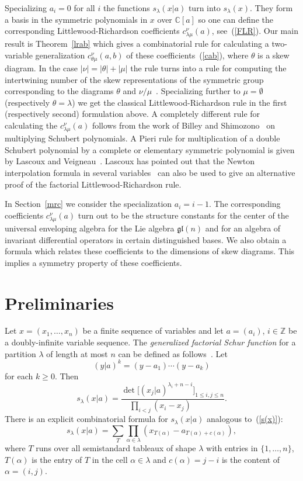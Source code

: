 \documentclass[titlepage,12pt]{article}
\newcommand{\beq}{\begin{equation}}
\newcommand{\eeq}{\end{equation}}
\newcommand{\la}{\lambda}
\newcommand{\0}{{\bf 0}}
\newcommand{\1}{{\bf 1}}
\newcommand{\2}{{\bf 2}}
\newcommand{\3}{{\bf 3}}
\newcommand{\4}{{\bf 4}}
\newcommand{\5}{{\bf 5}}
\newcommand{\6}{{\bf 6}}
\newcommand{\7}{{\bf 7}}
\newcommand{\8}{{\bf 8}}
\newcommand{\9}{{\bf 9}}
\newcommand{\C}{\mathbb{C}}
\newcommand{\gl}{\mathfrak{gl}}
\begin{document}
Specializing $a_i=0$ for all $i$ the functions 
$s_{\lambda}(x|a)$  turn into $s_{\lambda}(x)$. They
form a basis in the symmetric polynomials
in $x$ over $\C[a]$ so one can define the corresponding
Littlewood-Richardson coefficients $c_{\lambda\mu}^{\nu}(a)$,
see~(\ref{FLR}).  Our main result is Theorem~\ref{lrab} which
gives a combinatorial rule for calculating a two-variable
generalization $c_{\theta\mu}^{\nu}(a,b)$ of these
coefficients~(\ref{cab}), where $\theta$ is a skew diagram. 
In the case $|\nu|=|\theta|+|\mu|$ the rule turns into a rule for
computing the intertwining number of the skew
representations of the symmetric group corresponding to the diagrams
$\theta$ and $\nu/\mu$~\cite{jp:sss,zel:glr}.
Specializing further to  $\mu=\emptyset$ (respectively $\theta=\lambda$) we
get
the classical Littlewood-Richardson rule in the first (respectively
second)
formulation above.  
A completely different rule for calculating
the $c_{\la\mu}^\nu(a)$ follows from the work of Billey and
Shimozono~\cite{bs:nas} on multiplying Schubert polynomials.
A Pieri rule for multiplication of a double Schubert polynomial
by a complete or elementary symmetric polynomial is given by
Lascoux and Veigneau~\cite{vei:t}.  Lascoux has pointed out that
the Newton interpolation formula in several variables~\cite{ls:in} can
also be used to give an alternative proof of the factorial
Littlewood-Richardson rule.

In Section~\ref{mrc} we consider the specialization $a_i=i-1$.
The corresponding  coefficients $c_{\lambda\mu}^{\nu}(a)$ turn out to
be the structure constants for the center of the universal
enveloping algebra for the Lie algebra $\gl(n)$
and for an algebra of invariant differential operators in certain
distinguished bases.  We also obtain a formula which relates
these coefficients to the dimensions of skew diagrams. This implies
a symmetry property of these coefficients. 



\section{Preliminaries}		\label{p}

Let $x=(x_1,\dots,x_n)$ be a finite sequence of variables and
let $a=(a_i)$, $i\in\mathbb{Z}$ be a doubly-infinite variable
sequence. The {\it generalized factorial Schur function\/}
for a partition $\lambda$ of length at most $n$ can be defined
as follows~\cite{mac:sft}.  Let
$$
(y|a)^k=(y-a_1)\cdots (y-a_k)
$$
for each $k\geq 0$. Then 
\beq				\label{det}
s_{\lambda}(x|a)=
\frac{\det \bigl[(x_j|a)^{\lambda_i+n-i}\bigr]_{1\leq i,j\leq n}}
{\prod_{i<j}(x_i-x_j)\qquad\quad}. 
\eeq
There is an explicit combinatorial formula for $s_{\lambda}(x|a)$
analogous to~(\ref{s(x)}):
\beq				\label{sxa}
s_{\lambda}(x|a)=\sum_{T}\prod_{\alpha\in\lambda}
(x_{T(\alpha)}-a_{T(\alpha)+c(\alpha)}),
\eeq
where $T$ runs over all semistandard tableaux of shape $\lambda$
with entries in $\{1,\dots,n\}$, 
$T(\alpha)$ is the entry of $T$ in the cell
$\alpha\in\lambda$ and $c(\alpha)=j-i$ is the content of
$\alpha=(i,j)$.
\end{document}

